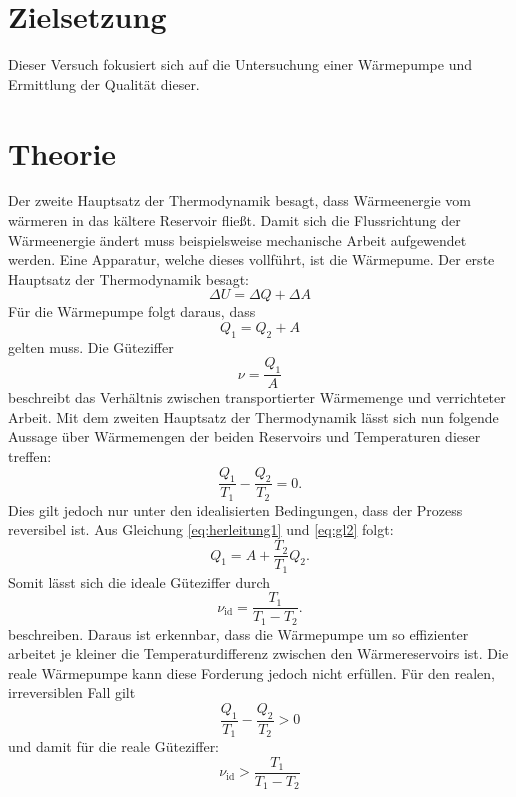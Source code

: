 \section{Zielsetzung}
Dieser Versuch fokusiert sich auf die Untersuchung einer Wärmepumpe und Ermittlung der Qualität dieser.
\section{Theorie}
\label{sec:Theorie}
Der zweite Hauptsatz der Thermodynamik besagt, dass Wärmeenergie vom wärmeren in das kältere Reservoir fließt.
Damit sich die Flussrichtung der Wärmeenergie ändert muss beispielsweise mechanische Arbeit aufgewendet werden.
Eine Apparatur, welche dieses vollführt, ist die Wärmepume.
Der erste Hauptsatz der Thermodynamik besagt:
\begin{equation}
	\Delta U = \Delta Q + \Delta A
\end{equation}
Für die Wärmepumpe folgt daraus, dass
\begin{equation}
	\label{eq:herleitung1}
	Q_1 = Q_2 + A
\end{equation}
gelten muss.
Die Güteziffer
%
\begin{equation}
	\label{eq:gl1}
	\nu=\frac{Q_1}{A}
\end{equation}
%
beschreibt das Verhältnis zwischen transportierter Wärmemenge und verrichteter Arbeit.
Mit dem zweiten Hauptsatz der Thermodynamik lässt sich nun folgende Aussage über Wärmemengen der beiden Reservoirs und Temperaturen dieser treffen:
\begin{equation}
		\label{eq:gl2}
	\frac{Q_1}{T_1}-\frac{Q_2}{T_2}=0.
\end{equation}
Dies gilt jedoch nur unter den idealisierten Bedingungen, dass der Prozess reversibel ist.
Aus Gleichung \eqref{eq:herleitung1} und \eqref{eq:gl2} folgt:
\begin{equation}
	Q_1 = A + \frac{T_2}{T_1} Q_2 .
\end{equation}
Somit lässt sich die ideale Güteziffer durch
\begin{equation}
	\nu_{\text{id}}=\frac{T_1}{T_1-T_2}.
	\label{eq:guetezifferideal}
\end{equation}
beschreiben.
Daraus ist erkennbar, dass die Wärmepumpe um so effizienter arbeitet je kleiner die Temperaturdifferenz zwischen den Wärmereservoirs ist.
Die reale Wärmepumpe kann diese Forderung jedoch nicht erfüllen.
Für den realen, irreversiblen Fall gilt
\begin{equation}
		\label{eq:gl3}
	\frac{Q_1}{T_1}-\frac{Q_2}{T_2}>0
\end{equation}
und damit für die reale Güteziffer:
\begin{equation}
\nu_{\text{id}} > \frac{T_1}{T_1-T_2}
\end{equation}
